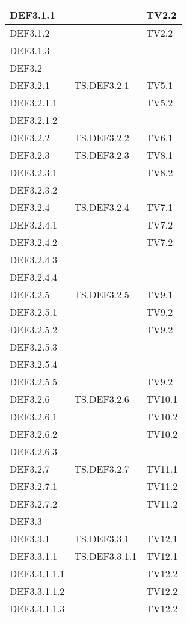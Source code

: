 \documentclass{scalatekids-article}
\begin{document}
\begin{longtable}[H]{|l|p{4cm}|p{4cm}|}
  \hline
  DEF3.1.1 & & TV2.2\\
  \hline
  DEF3.1.2 & & TV2.2\\
  \hline
  DEF3.1.3 & &\\
  \hline
  DEF3.2 & &\\
  \hline
  DEF3.2.1 & TS.DEF3.2.1 & TV5.1 \\
  \hline
  DEF3.2.1.1 & & TV5.2\\
  \hline
  DEF3.2.1.2 & &\\
  \hline
  DEF3.2.2 & TS.DEF3.2.2 & TV6.1\\
  \hline
  DEF3.2.3 & TS.DEF3.2.3 & TV8.1\\
  \hline
  DEF3.2.3.1 & & TV8.2\\
  \hline
  DEF3.2.3.2 & & \\
  \hline
  DEF3.2.4 & TS.DEF3.2.4 & TV7.1\\
  \hline
  DEF3.2.4.1 & & TV7.2\\
  \hline
  DEF3.2.4.2 & & TV7.2\\
  \hline
  DEF3.2.4.3 & & \\
  \hline
  DEF3.2.4.4 & & \\
  \hline
  DEF3.2.5 & TS.DEF3.2.5 & TV9.1\\
  \hline
  DEF3.2.5.1 & & TV9.2\\
  \hline
  DEF3.2.5.2 & & TV9.2\\
  \hline
  DEF3.2.5.3 & & \\
  \hline
  DEF3.2.5.4 & & \\
  \hline
  DEF3.2.5.5 & & TV9.2\\
  \hline
  DEF3.2.6 & TS.DEF3.2.6 & TV10.1\\
  \hline
  DEF3.2.6.1 & & TV10.2\\
  \hline
  DEF3.2.6.2 & & TV10.2\\
  \hline
  DEF3.2.6.3 & & \\
  \hline
  DEF3.2.7 & TS.DEF3.2.7 & TV11.1\\
  \hline
  DEF3.2.7.1 & & TV11.2\\
  \hline
  DEF3.2.7.2 & & TV11.2\\
  \hline
  DEF3.3 & & \\
  \hline
  DEF3.3.1 & TS.DEF3.3.1 & TV12.1\\
  \hline
  DEF3.3.1.1 & TS.DEF3.3.1.1 & TV12.1\\
  \hline
  DEF3.3.1.1.1 & & TV12.2\\
  \hline
  DEF3.3.1.1.2 & & TV12.2\\
  \hline
  DEF3.3.1.1.3 & & TV12.2\\

\end{longtable}
\end{document}
